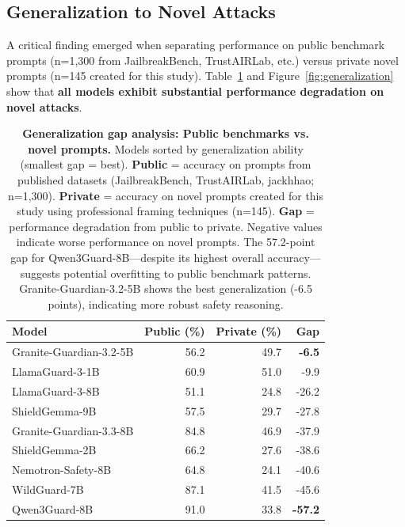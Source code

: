 \documentclass{article}
\begin{document}
\subsection{Generalization to Novel Attacks}
A critical finding emerged when separating performance on public benchmark prompts (n=1,300 from JailbreakBench, TrustAIRLab, etc.) versus private novel prompts (n=145 created for this study). Table~\ref{tab:generalization} and Figure~\ref{fig:generalization} show that \textbf{all models exhibit substantial performance degradation on novel attacks}.

\begin{table}[h]
\caption{\textbf{Generalization gap analysis: Public benchmarks vs. novel prompts.} Models sorted by generalization ability (smallest gap = best). \textbf{Public} = accuracy on prompts from published datasets (JailbreakBench, TrustAIRLab, jackhhao; n=1,300). \textbf{Private} = accuracy on novel prompts created for this study using professional framing techniques (n=145). \textbf{Gap} = performance degradation from public to private. Negative values indicate worse performance on novel prompts. The 57.2-point gap for Qwen3Guard-8B---despite its highest overall accuracy---suggests potential overfitting to public benchmark patterns. Granite-Guardian-3.2-5B shows the best generalization (-6.5 points), indicating more robust safety reasoning.}
\centering
\begin{tabular}{lrrr}
\toprule
Model & Public (\%) & Private (\%) & Gap \\
\midrule
Granite-Guardian-3.2-5B & 56.2 & 49.7 & \textbf{-6.5} \\
LlamaGuard-3-1B & 60.9 & 51.0 & -9.9 \\
LlamaGuard-3-8B & 51.1 & 24.8 & -26.2 \\
ShieldGemma-9B & 57.5 & 29.7 & -27.8 \\
Granite-Guardian-3.3-8B & 84.8 & 46.9 & -37.9 \\
ShieldGemma-2B & 66.2 & 27.6 & -38.6 \\
Nemotron-Safety-8B & 64.8 & 24.1 & -40.6 \\
WildGuard-7B & 87.1 & 41.5 & -45.6 \\
Qwen3Guard-8B & 91.0 & 33.8 & \textbf{-57.2} \\
\bottomrule
\end{tabular}
\label{tab:generalization}
\end{table}
\end{document}

